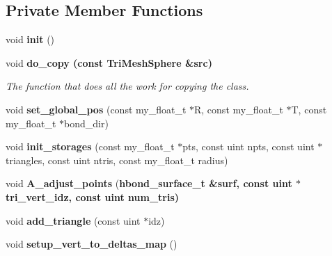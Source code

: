 \subsection*{Private Member Functions}
\begin{CompactItemize}
\item 
void \textbf{init} ()\label{classASCbase_1_1geometry_1_1TriMeshSphere_08a7be3e5e7bed201fa7f24da0d18b47}

\item 
void \bf{do\_\-copy} (const \bf{Tri\-Mesh\-Sphere} \&src)\label{classASCbase_1_1geometry_1_1TriMeshSphere_140990c6bc17c7f0f46950c2262fe0e5}

\begin{CompactList}\small\item\em The function that does all the work for copying the class. \item\end{CompactList}\item 
void \textbf{set\_\-global\_\-pos} (const my\_\-float\_\-t $\ast$R, const my\_\-float\_\-t $\ast$T, const my\_\-float\_\-t $\ast$bond\_\-dir)\label{classASCbase_1_1geometry_1_1TriMeshSphere_dd481c24ae86c6ccab7eae4965d44beb}

\item 
void \textbf{init\_\-storages} (const my\_\-float\_\-t $\ast$pts, const uint npts, const uint $\ast$triangles, const uint ntris, const my\_\-float\_\-t radius)\label{classASCbase_1_1geometry_1_1TriMeshSphere_19b9aa460a8c48a1ebe6eff1c0ecee43}

\item 
void \textbf{A\_\-adjust\_\-points} (\bf{hbond\_\-surface\_\-t} \&surf, const uint $\ast$tri\_\-vert\_\-idz, const uint num\_\-tris)\label{classASCbase_1_1geometry_1_1TriMeshSphere_3cbe2b20213813abb31e070f5898d7b2}

\item 
void \textbf{add\_\-triangle} (const uint $\ast$idz)\label{classASCbase_1_1geometry_1_1TriMeshSphere_533c34ac5b9c4435802391c6e5329048}

\item 
void \textbf{setup\_\-vert\_\-to\_\-deltas\_\-map} ()\label{classASCbase_1_1geometry_1_1TriMeshSphere_bba5d7fbb2e79443cf7294b0fed4662c}

\end{CompactItemize}
